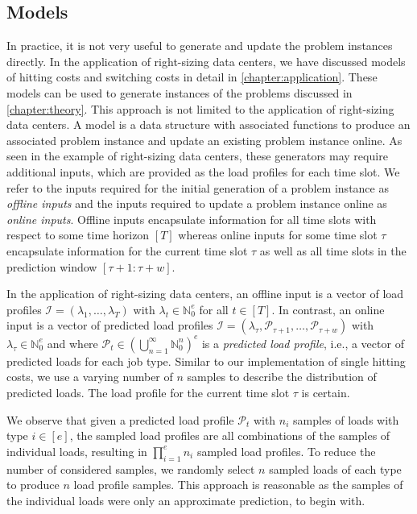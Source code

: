 \subsection{Models}

In practice, it is not very useful to generate and update the problem instances directly. In the application of right-sizing data centers, we have discussed models of hitting costs and switching costs in detail in \autoref{chapter:application}. These models can be used to generate instances of the problems discussed in \autoref{chapter:theory}. This approach is not limited to the application of right-sizing data centers. A model is a data structure with associated functions to produce an associated problem instance and update an existing problem instance online. As seen in the example of right-sizing data centers, these generators may require additional inputs, which are provided as the load profiles for each time slot. We refer to the inputs required for the initial generation of a problem instance as \emph{offline inputs} and the inputs required to update a problem instance online as \emph{online inputs}. Offline inputs encapsulate information for all time slots with respect to some time horizon $[T]$ whereas online inputs for some time slot $\tau$ encapsulate information for the current time slot $\tau$ as well as all time slots in the prediction window $[\tau + 1 : \tau + w]$.

In the application of right-sizing data centers, an offline input is a vector of load profiles $\mathcal{I} = (\lambda_1, \dots, \lambda_T)$ with $\lambda_t \in \mathbb{N}_0^e$ for all $t \in [T]$. In contrast, an online input is a vector of predicted load profiles $\mathcal{I} = (\lambda_{\tau}, \mathcal{P}_{\tau + 1}, \dots, \mathcal{P}_{\tau + w})$ with $\lambda_{\tau} \in \mathbb{N}_0^e$ and where $\mathcal{P}_t \in \left(\bigcup_{n=1}^{\infty} \mathbb{N}_0^n\right)^e$ is a \emph{predicted load profile}, i.e., a vector of predicted loads for each job type. Similar to our implementation of single hitting costs, we use a varying number of $n$ samples to describe the distribution of predicted loads. The load profile for the current time slot $\tau$ is certain.

We observe that given a predicted load profile $\mathcal{P}_t$ with $n_i$ samples of loads with type $i \in [e]$, the sampled load profiles are all combinations of the samples of individual loads, resulting in $\prod_{i=1}^e n_i$ sampled load profiles. To reduce the number of considered samples, we randomly select $n$ sampled loads of each type to produce $n$ load profile samples. This approach is reasonable as the samples of the individual loads were only an approximate prediction, to begin with.

